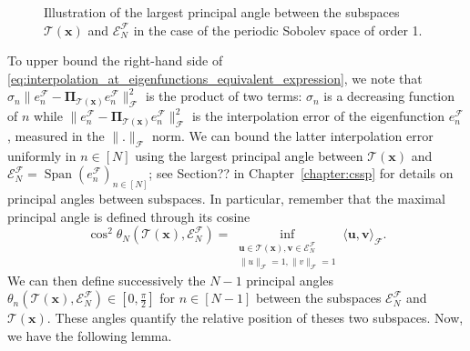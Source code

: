 \documentclass[twoside,11pt]{book}
\numberwithin{theorem}{chapter}
\numberwithin{definition}{chapter}
\numberwithin{proposition}{chapter}
\numberwithin{corollary}{chapter}
\numberwithin{example}{chapter}
\numberwithin{lemma}{chapter}
\DeclareMathOperator{\Span}{\mathrm{Span}}
\DeclareMathOperator{\F}{\mathcal{F}}
\newcommand{\rb}[1]{\textcolor{magenta}{#1}}
\begin{document}

\begin{figure}[]
\centering

 \caption{Illustration of the largest principal angle between the subspaces $\mathcal{T}(\bm{x})$ and $\mathcal{E}_{N}^{\mathcal{F}}$ in the case of the periodic Sobolev space of order 1.  \label{fig:func_principal_angles}}
\end{figure}


To upper bound the right-hand side of \eqref{eq:interpolation_at_eigenfunctions_equivalent_expression}, we note that $\sigma_{n} \|e_{n}^{\F} - \bm{\Pi}_{\mathcal{T}(\bm{x})} e_{n}^{\F}\|_{\mathcal{F}}^{2}$ is the product of two terms: $\sigma_{n}$ is a decreasing function of $n$ while $\|e_{n}^{\F} - \bm{\Pi}_{\mathcal{T}(\bm{x})} e_{n}^{\F}\|_{\mathcal{F}}^{2}$ is the interpolation error of the eigenfunction $e_{n}^{\mathcal{F}}$, measured in the $\|.\|_{\mathcal{F}}$ norm.
We can bound the latter interpolation error uniformly in $n\in [N]$ using the largest principal angle between $\mathcal{T}(\bm{x})$ and $\mathcal{E}^{\mathcal{F}}_{N} = \Span(e_{n}^{\mathcal{F}})_{ n \in [N]}$; see Section?? in Chapter~\ref{chapter:cssp} for details on principal angles between subspaces. In particular, remember that the maximal principal angle is defined through its cosine
\begin{equation}
	\cos^{2} \theta_{N}(\mathcal{T}(\bm{x}),\mathcal{E}^{\mathcal{F}}_{N}) = \inf\limits_{\substack{\bm{u} \in \mathcal{T}(\bm{x}), \bm{v} \in \mathcal{E}^{\mathcal{F}}_{N}\\ \|u\|_{\mathcal{F}} = 1, \|v\|_{\mathcal{F}} = 1}} \langle \bm{u}, \bm{v} \rangle_{\mathcal{F}}.
\end{equation}
We can then define successively the $N-1$ principal angles $\theta_{n}(\mathcal{T}(\bm{x}),\mathcal{E}^{\mathcal{F}}_{N}) \in \left[0, \frac{\pi}{2}\right]$ for $ n\in [N-1]$ between the subspaces $\mathcal{E}^{\mathcal{F}}_{N}$ and $\mathcal{T}(\bm{x})$. These angles quantify the relative position of theses two subspaces. Now, we have the following lemma.
\end{document}
